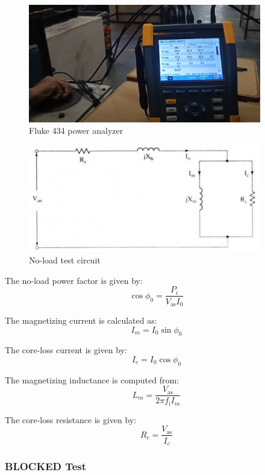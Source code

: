 
\begin{figure}[H]
	\centering
	\includegraphics[width=4in]{sections/section5/images/ParamEstim/FlukeVoltAmpHertz.png}
	\caption{Fluke 434 power analyzer}
	\label{fig:fluke434}
\end{figure}


\begin{figure}[H]
	\centering
	\includegraphics[width=4in]{sections/section5/images/ParamEstim/noloadCircuitKrish.png}
	\caption{No-load test circuit}
	\label{fig:no_load_test}
\end{figure}

The no-load power factor is given by:
$$\cos \phi_0 = \frac{P_i}{V_\text{as}I_0}$$

The magnetizing current is calculated as:
$$I_m = I_0 \sin \phi_0$$

The core-loss current is given by:
$$I_c = I_0 \cos \phi_0$$

The magnetizing inductance is computed from:
$$L_m = \frac{V_\text{as}}{2\pi f_\text{i}I_m}$$

The core-loss resistance is given by:
$$R_c = \frac{V_\text{as}}{I_c}$$


\subsubsection{BLOCKED Test}

